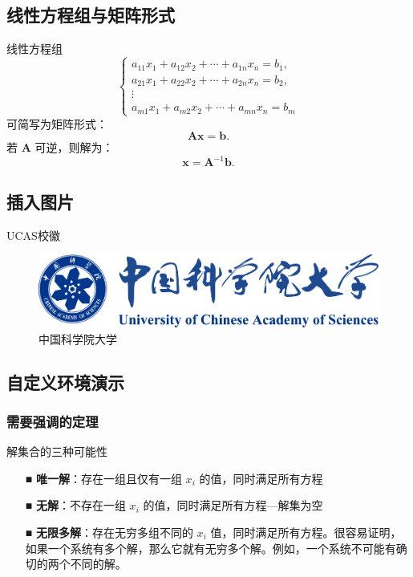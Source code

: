 \documentclass[10pt, a4paper]{article}
\begin{document}
\subsection{线性方程组与矩阵形式}
线性方程组
\[
\begin{cases}
a_{11}x_1 + a_{12}x_2 + \cdots + a_{1n}x_n = b_1,\\
a_{21}x_1 + a_{22}x_2 + \cdots + a_{2n}x_n = b_2,\\
\vdots \\
a_{m1}x_1 + a_{m2}x_2 + \cdots + a_{mn}x_n = b_m
\end{cases}
\]
可简写为矩阵形式：
\[
\mathbf{A}\mathbf{x} = \mathbf{b}.
\]
若 $\mathbf{A}$ 可逆，则解为：
\[
\mathbf{x} = \mathbf{A}^{-1}\mathbf{b}.
\]


\subsection{插入图片}
UCAS校徽

\begin{figure}[!htbp]
    \centering
    \includegraphics[width =.4\textwidth]{images/ucas_logo.pdf}
    \caption{中国科学院大学}
    \label{UCAS}
\end{figure}

\subsection{自定义环境演示}

\subsubsection{需要强调的定理}
\begin{bluebox}{解集合的三种可能性}
\begin{itemize}[leftmargin=*, labelsep=0.5em, itemsep=0.5em, topsep=0.5em]
  \item[■] \textbf{唯一解}：存在一组且仅有一组 $x_{i}$ 的值，同时满足所有方程
  \item[■] \textbf{无解}：不存在一组 $x_{i}$ 的值，同时满足所有方程—解集为空
  \item[■] \textbf{无限多解}：存在无穷多组不同的 $x_{i}$ 值，同时满足所有方程。很容易证明，如果一个系统有多个解，那么它就有无穷多个解。例如，一个系统不可能有确切的两个不同的解。
\end{itemize}
\end{bluebox}
\end{document}

